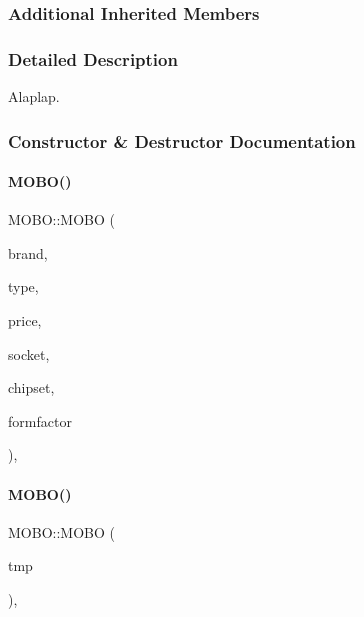 \subsubsection*{Additional Inherited Members}


\subsubsection{Detailed Description}
Alaplap. 

\subsubsection{Constructor \& Destructor Documentation}
\mbox{\label{class_m_o_b_o_a3185de871765391ae3a0ffe4b0af7e5b}} 
\paragraph{\texorpdfstring{MOBO()}{MOBO()}\hspace{0.1cm}{\footnotesize\ttfamily [1/2]}}
{\footnotesize\ttfamily M\+O\+B\+O\+::\+M\+O\+BO (\begin{DoxyParamCaption}\item[{\mbox{\hyperlink{class_string}{String}}}]{brand,  }\item[{\mbox{\hyperlink{class_string}{String}}}]{type,  }\item[{int}]{price,  }\item[{\mbox{\hyperlink{class_string}{String}}}]{socket,  }\item[{\mbox{\hyperlink{class_string}{String}}}]{chipset,  }\item[{\mbox{\hyperlink{class_string}{String}}}]{formfactor }\end{DoxyParamCaption})\hspace{0.3cm}{\ttfamily [inline]}, {\ttfamily [explicit]}}

\mbox{\label{class_m_o_b_o_a544dc57e821c152a922a3d8bc9913500}} 
\paragraph{\texorpdfstring{MOBO()}{MOBO()}\hspace{0.1cm}{\footnotesize\ttfamily [2/2]}}
{\footnotesize\ttfamily M\+O\+B\+O\+::\+M\+O\+BO (\begin{DoxyParamCaption}\item[{\mbox{\hyperlink{struct_temp_input}{Temp\+Input}} \&}]{tmp }\end{DoxyParamCaption})\hspace{0.3cm}{\ttfamily [inline]}, {\ttfamily [explicit]}}



